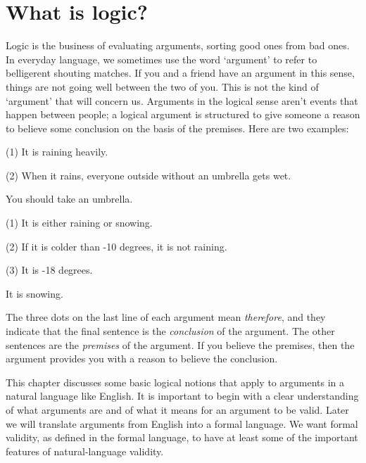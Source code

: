 \chapter{What is logic?}
\label{ch.intro}

Logic is the business of evaluating arguments, sorting good ones from bad ones. In everyday language, we sometimes use the word `argument' to refer to belligerent shouting matches. If you and a friend have an argument in this sense, things are not going well between the two of you. This is not the kind of `argument' that will concern us. Arguments in the logical sense aren't events that happen between people; a logical argument is structured to give someone a reason to believe some conclusion on the basis of the premises. Here are two examples:

\label{argRaining}
\begin{earg}
  \item[(1)] It is raining heavily.
  \item[(2)] When it rains, everyone outside without an umbrella gets wet.
  \item[\therefore] You should take an umbrella.
\end{earg}


\label{argSnowing}
\begin{earg}
  \item[(1)] It is either raining or snowing.
  \item[(2)] If it is colder than -10 degrees, it is not raining.
  \item[(3)] It is -18 degrees.
  \item[\therefore] It is snowing.
\end{earg}
 
The three dots on the last line of each argument mean \textit{therefore}, and they indicate that the final sentence is the \textsl{conclusion} of the argument. The other sentences are the \textsl{premises} of the argument. If you believe the premises, then the argument provides you with a reason to believe the conclusion.

This chapter discusses some basic logical notions that apply to arguments in a natural language like English. It is important to begin with a clear understanding of what arguments are and of what it means for an argument to be valid. Later we will translate arguments from English into a formal language. We want formal validity, as defined in the formal language, to have at least some of the important features of natural-language validity.

